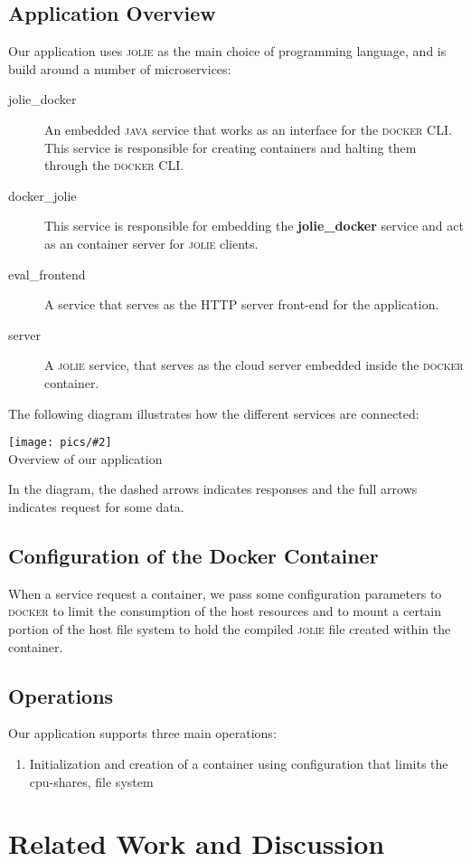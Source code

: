 \documentclass[12pt]{article}
\newcommand{\img}[3] {
	\begin{center}
	\texttt{[image: pics/\#2]}\\
	{\small #3}
	\end{center}
}
\newcommand{\docker}[0] {\textsc{docker}}
\newcommand{\jolie}[0] {\textsc{jolie}}
\newcommand{\java} {\textsc{java}}
\begin{document}
\subsection{Application Overview}
Our application uses \jolie{} as the main choice of programming language, and is build around a number of microservices:

\begin{description}
\item[jolie\_docker] An embedded \java{} service that works as an interface for the \docker{} CLI. This service is responsible for creating containers and halting them through the \docker{} CLI. 
\item[docker\_jolie] This service is responsible for embedding the \textbf{jolie\_docker} service and act as an container server for \jolie{} clients. 
\item[eval\_frontend] A service that serves as the HTTP server front-end for the application. 
\item[server] A \jolie{} service, that serves as the cloud server embedded inside the \docker{} container.
\end{description}
The following diagram illustrates how the different services are connected:
\img{0.6}{system}{Overview of our application}
In the diagram, the dashed arrows indicates responses and the full arrows indicates request for some data.

\subsection{Configuration of the Docker Container}

When a service request a container, we pass some configuration parameters to \docker{} to limit the consumption of the host resources and to mount a certain portion of the host file system to hold the compiled \jolie{} file created within the container.

\subsection{Operations}
Our application supports three main operations:
\begin{enumerate}
\item Initialization and creation of a container using configuration that limits the cpu-shares, file system 
\end{enumerate}

\section{Related Work and Discussion}
\end{document}
